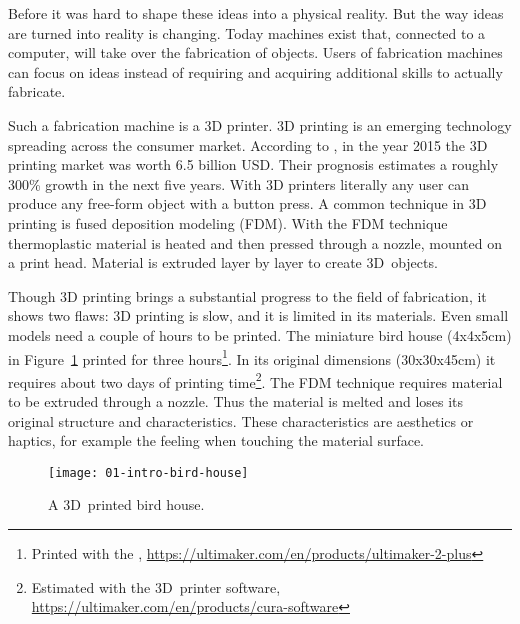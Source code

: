 \documentclass[../ClassicThesis.tex]{subfiles}
\begin{document}
Before it was hard to shape these ideas into a physical reality. But
the way ideas are turned into reality is changing. Today machines
exist that, connected to a computer, will take over the fabrication of
objects. Users of fabrication machines can focus on ideas
instead of requiring and acquiring additional skills to actually
fabricate.


Such a fabrication machine is a 3D printer. 3D printing is an emerging
technology spreading across the consumer market. According to
, in the year 2015 the 3D printing market was
worth 6.5 billion USD. Their prognosis estimates a roughly 300\%
growth in the next five years\cite{wohlers-market}. With 3D printers
literally any user can produce any free-form object with a button
press. A common technique in 3D printing is fused deposition modeling
(FDM)\cite{}. With the FDM technique
thermoplastic material is heated and then pressed through a nozzle,
mounted on a print head. Material is extruded layer by layer  to
create 3D~objects\cite{}.


Though 3D printing brings a substantial progress to the
field of fabrication, it shows two flaws: 3D printing is
slow, and it is limited in its materials. Even small models
need a couple of hours to be printed. The miniature bird
house (4x4x5cm) in Figure~\ref{fig:intro-bird-house} printed
for three hours\footnote{Printed with the
  ,
  \url{https://ultimaker.com/en/products/ultimaker-2-plus}}.
In its original dimensions (30x30x45cm) it requires about
two days of printing time\footnote{Estimated with the
   3D~printer software,
  \url{https://ultimaker.com/en/products/cura-software}}.
The FDM technique requires material to be extruded through a
nozzle. Thus the material is melted and loses its original
structure and characteristics. These characteristics are
aesthetics or haptics, for example the feeling when touching
the material surface.

\begin{figure}[ht]
  \texttt{[image: 01-intro-bird-house]}
  \caption{A 3D~printed bird house.}
  \label{fig:intro-bird-house}
\end{figure}
\end{document}
